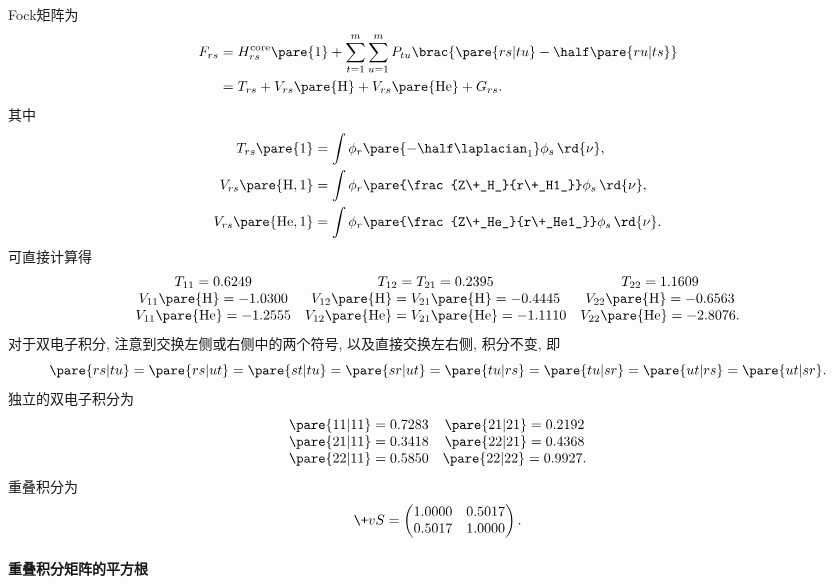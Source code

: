 \documentclass[hidelinks]{ctexart}
\begin{document}
Fock矩阵为
\begin{align*}
    F_{rs} &= H_{rs}^{\mathrm{core}}\pare{1} + \sum_{t=1}^m \sum_{u=1}^m P_{tu}\brac{\pare{rs\vert tu} - \half \pare{ru\vert ts}} \\
    &= T_{rs} + V_{rs}\pare{\mathrm{H}} + V_{rs}\pare{\mathrm{He}} + G_{rs}.
\end{align*}
其中
\begin{align*}
    T_{rs}\pare{1} &= \int \phi_r \pare{-\half \laplacian_1}\phi_s\,\rd{\nu}, \\
    V_{rs}\pare{\mathrm{H},1} &= \int \phi_r\pare{\frac{Z\+_H_}{r\+_H1_}}\phi_s\,\rd{\nu}, \\
    V_{rs}\pare{\mathrm{He},1} &= \int \phi_r \pare{\frac{Z\+_He_}{r\+_He1_}}\phi_s\,\rd{\nu}.
\end{align*}
可直接计算得
\[ \begin{array}{ccc}
    T_{11} = 0.6249 & T_{12} = T_{21} = 0.2395 & T_{22} = 1.1609 \\
    V_{11}\pare{\mathrm{H}}  = -1.0300 & V_{12}\pare{\mathrm{H}} = V_{21}\pare{\mathrm{H}} = -0.4445 & V_{22}\pare{\mathrm{H}} = -0.6563 \\
    V_{11}\pare{\mathrm{He}} = -1.2555 & V_{12}\pare{\mathrm{He}} = V_{21}\pare{\mathrm{He}} = -1.1110 & V_{22}\pare{\mathrm{He}} = -2.8076.
\end{array} \]
对于双电子积分, 注意到交换左侧或右侧中的两个符号, 以及直接交换左右侧, 积分不变, 即
\[ \pare{rs\vert tu} = \pare{rs\vert ut} = \pare{st\vert tu} = \pare{sr\vert ut} = \pare{tu\vert rs} = \pare{tu\vert sr} = \pare{ut\vert rs} = \pare{ut\vert sr}. \]
独立的双电子积分为
\[ \begin{array}{cc}
    \pare{11\vert 11} = 0.7283 & \pare{21\vert 21} = 0.2192 \\
    \pare{21\vert 11} = 0.3418 & \pare{22\vert 21} = 0.4368 \\
    \pare{22\vert 11} = 0.5850 & \pare{22\vert 22} = 0.9927.
\end{array} \]
重叠积分为
\[ \+vS = \begin{pmatrix}
    1.0000 & 0.5017 \\
    0.5017 & 1.0000
\end{pmatrix}. \]


\paragraph{重叠积分矩阵的平方根} %
\label{par:重叠积分矩阵的平方根}
\end{document}
